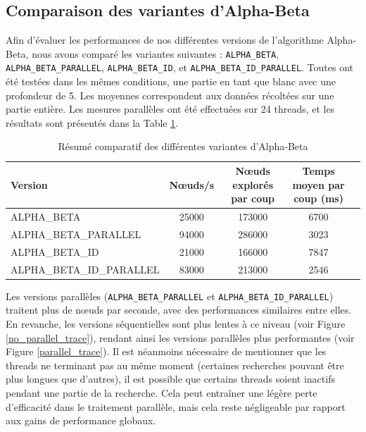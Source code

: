 \documentclass{article}
\begin{document}
\subsection{Comparaison des variantes d'Alpha-Beta} Afin d'évaluer les performances de nos différentes versions de l'algorithme Alpha-Beta, nous avons comparé les variantes suivantes : \texttt{ALPHA\_BETA}, \texttt{ALPHA\_BETA\_PARALLEL}, \texttt{ALPHA\_BETA\_ID}, et \texttt{ALPHA\_BETA\_ID\_PARALLEL}. Toutes ont été testées dans les mêmes conditions, une partie en tant que blanc avec une profondeur de 5. Les moyennes correspondent aux données récoltées sur une partie entière. Les mesures parallèles ont été effectuées sur 24 threads, et les résultats sont présentés dans la Table \ref{tab:ab_comparison}.

\begin{table}[h]
    \centering
    \caption{Résumé comparatif des différentes variantes d'Alpha-Beta}
    \label{tab:ab_comparison}
    \begin{tabular}{|l|c|c|c|c|}
        \hline
        \textbf{Version} & \textbf{Nœuds/s} & \textbf{Nœuds explorés par coup} & \textbf{Temps moyen par coup (ms)} \\
        \hline
        ALPHA\_BETA & 25000 & 173000 & 6700 \\
        \hline
        ALPHA\_BETA\_PARALLEL & 94000 & 286000 & 3023 \\
        \hline
        ALPHA\_BETA\_ID & 21000 & 166000 & 7847 \\
        \hline
        ALPHA\_BETA\_ID\_PARALLEL & 83000 & 213000 & 2546 \\
        \hline
    \end{tabular}
\end{table}
\FloatBarrier

Les versions parallèles (\texttt{ALPHA\_BETA\_PARALLEL} et \texttt{ALPHA\_BETA\_ID\_PARALLEL}) traitent plus de nœuds par seconde, avec des performances similaires entre elles. En revanche, les versions séquentielles sont plus lentes à ce niveau (voir Figure \ref{no_parallel_trace}), rendant ainsi les versions parallèles plus performantes (voir Figure \ref{parallel_trace}). 
Il est néanmoins nécessaire de mentionner que les threads ne terminant pas au même moment (certaines recherches pouvant être plus longues que d'autres), il est possible que certains threads soient inactifs pendant une partie de la recherche. Cela peut entraîner une légère perte d'efficacité dans le traitement parallèle, mais cela reste négligeable par rapport aux gains de performance globaux.
\end{document}
